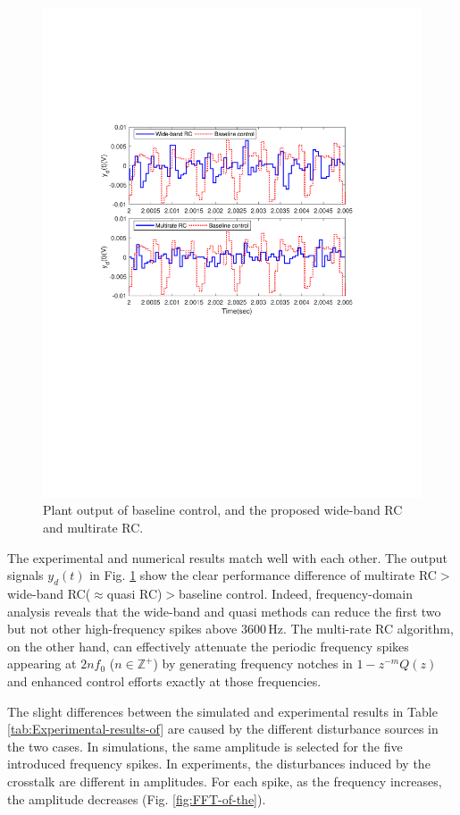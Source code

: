 \documentclass [11pt, proquest] {uwthesis}[2020/02/24]
\begin{document}
\begin{figure}[!ht]
\begin{centering}
\includegraphics[width=12cm]{Fractional-order-RC/Wideband_multi_time_exp}
\par\end{centering}
\caption{\label{fig:Yd(t)_wideband-exp}Plant output of baseline control, and
the proposed wide-band RC and multirate RC.}
\end{figure}
The experimental and numerical results match well with each other.
The output signals $y_{d}(t)$ in Fig. \ref{fig:Yd(t)_wideband-exp}
show the clear performance difference of multirate RC$>$wide-band
RC($\approx$quasi RC)$>$baseline control. Indeed, frequency-domain
analysis reveals that the wide-band and quasi methods can reduce the
first two but not other high-frequency spikes above $3600\,\text{Hz}$.
The multi-rate RC algorithm, on the other hand, can effectively attenuate
the periodic frequency spikes appearing at $2nf_{0}$ ($n\in\mathbb{Z}^{+}$)
by generating frequency notches in $1-z^{-m}Q(z)$ and enhanced control
efforts exactly at those frequencies.

The slight differences between the simulated and experimental results
in Table \ref{tab:Experimental-results-of} are caused by the different
disturbance sources in the two cases. In simulations, the same amplitude
is selected for the five introduced frequency spikes. In experiments,
the disturbances induced by the crosstalk are different in amplitudes.
For each spike, as the frequency increases, the amplitude decreases
(Fig. \ref{fig:FFT-of-the}).
\end{document}
